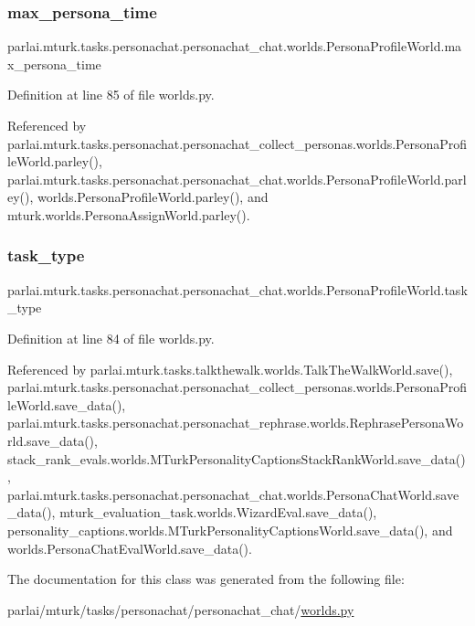 \subsubsection{\texorpdfstring{max\+\_\+persona\+\_\+time}{max\_persona\_time}}
{\footnotesize\ttfamily parlai.\+mturk.\+tasks.\+personachat.\+personachat\+\_\+chat.\+worlds.\+Persona\+Profile\+World.\+max\+\_\+persona\+\_\+time}



Definition at line 85 of file worlds.\+py.



Referenced by parlai.\+mturk.\+tasks.\+personachat.\+personachat\+\_\+collect\+\_\+personas.\+worlds.\+Persona\+Profile\+World.\+parley(), parlai.\+mturk.\+tasks.\+personachat.\+personachat\+\_\+chat.\+worlds.\+Persona\+Profile\+World.\+parley(), worlds.\+Persona\+Profile\+World.\+parley(), and mturk.\+worlds.\+Persona\+Assign\+World.\+parley().

\mbox{\label{classparlai_1_1mturk_1_1tasks_1_1personachat_1_1personachat__chat_1_1worlds_1_1PersonaProfileWorld_a1f5c0449ba2b78995696e5d428ddc71a}} 
\subsubsection{\texorpdfstring{task\+\_\+type}{task\_type}}
{\footnotesize\ttfamily parlai.\+mturk.\+tasks.\+personachat.\+personachat\+\_\+chat.\+worlds.\+Persona\+Profile\+World.\+task\+\_\+type}



Definition at line 84 of file worlds.\+py.



Referenced by parlai.\+mturk.\+tasks.\+talkthewalk.\+worlds.\+Talk\+The\+Walk\+World.\+save(), parlai.\+mturk.\+tasks.\+personachat.\+personachat\+\_\+collect\+\_\+personas.\+worlds.\+Persona\+Profile\+World.\+save\+\_\+data(), parlai.\+mturk.\+tasks.\+personachat.\+personachat\+\_\+rephrase.\+worlds.\+Rephrase\+Persona\+World.\+save\+\_\+data(), stack\+\_\+rank\+\_\+evals.\+worlds.\+M\+Turk\+Personality\+Captions\+Stack\+Rank\+World.\+save\+\_\+data(), parlai.\+mturk.\+tasks.\+personachat.\+personachat\+\_\+chat.\+worlds.\+Persona\+Chat\+World.\+save\+\_\+data(), mturk\+\_\+evaluation\+\_\+task.\+worlds.\+Wizard\+Eval.\+save\+\_\+data(), personality\+\_\+captions.\+worlds.\+M\+Turk\+Personality\+Captions\+World.\+save\+\_\+data(), and worlds.\+Persona\+Chat\+Eval\+World.\+save\+\_\+data().



The documentation for this class was generated from the following file\+:\begin{DoxyCompactItemize}
\item 
parlai/mturk/tasks/personachat/personachat\+\_\+chat/\hyperlink{parlai_2mturk_2tasks_2personachat_2personachat__chat_2worlds_8py}{worlds.\+py}\end{DoxyCompactItemize}
